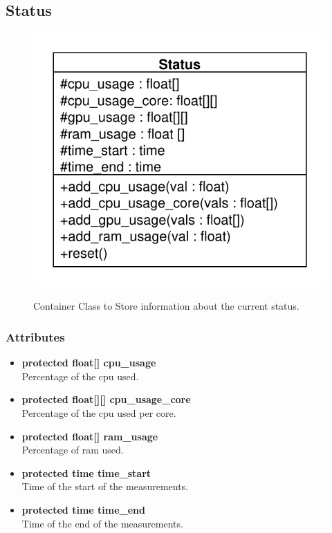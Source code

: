 \subsection{Status}
\begin{figure}[htbp]
	\begin{minipage}[t]{7cm}
		\vspace{0pt}
		\centering
		\includegraphics[scale=0.6]{./diagram_pictures/NodeInterface/Status.pdf}
	\end{minipage}
	\hfill
	\begin{minipage}[t]{8cm}
		\vspace{10pt}
		Container Class to Store information about the current status.
	\end{minipage}
\end{figure}


\subsubsection{Attributes}
\begin{itemize}
	\item \textbf{protected float[] cpu\_usage }\\
	Percentage of the cpu used.
	\item \textbf{protected float[][] cpu\_usage\_core}\\
	Percentage of the cpu used per core.
	\item \textbf{protected float[] ram\_usage}\\
	Percentage of ram used.
	\item \textbf{protected time time\_start}\\
	Time of the start of the measurements.
	\item \textbf{protected time time\_end}\\
	Time of the end of the measurements.
\end{itemize}

